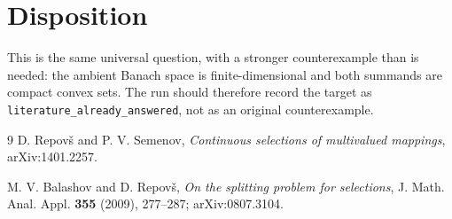\documentclass[10pt]{article}
\begin{document}
\section*{Disposition}

This is the same universal question, with a stronger counterexample than is
needed: the ambient Banach space is finite-dimensional and both summands are
compact convex sets. The run should therefore record the target as
\texttt{literature\_already\_answered}, not as an original counterexample.

\begin{thebibliography}{9}
D. Repov\v{s} and P. V. Semenov,
\emph{Continuous selections of multivalued mappings}, arXiv:1401.2257.

M. V. Balashov and D. Repov\v{s},
\emph{On the splitting problem for selections},
J. Math. Anal. Appl. \textbf{355} (2009), 277--287;
arXiv:0807.3104.
\end{thebibliography}
\end{document}
